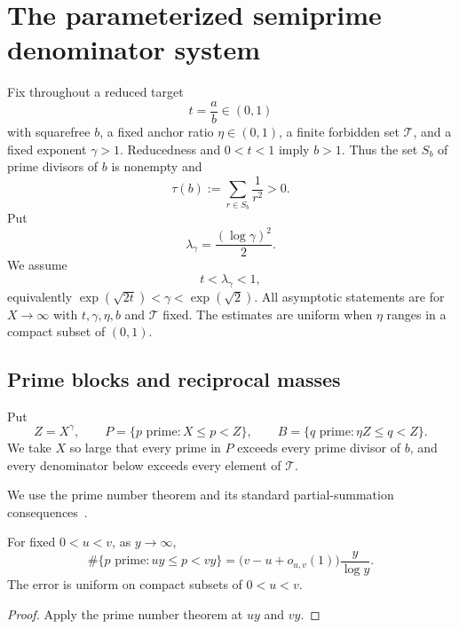 \section{The parameterized semiprime denominator system}
\label{sec:denominator-system}

Fix throughout a reduced target
\[
 t=\frac ab\in(0,1)
\]
with squarefree $b$, a fixed anchor ratio $\eta\in(0,1)$, a finite forbidden set $\mathcal T$, and a fixed exponent $\gamma>1$. Reducedness and $0<t<1$ imply $b>1$. Thus the set $S_b$ of prime divisors of $b$ is nonempty and
\begin{equation}
\label{eq:tau-positive}
 \tau(b):=\sum_{r\in S_b}\frac1{r^2}>0.
\end{equation}
Put
\begin{equation}
\label{eq:lambda-gamma}
 \lambda_\gamma=\frac{(\log\gamma)^2}{2}.
\end{equation}
We assume
\begin{equation}
\label{eq:admissible-region}
 t<\lambda_\gamma<1,
\end{equation}
equivalently $\exp(\sqrt{2t})<\gamma<\exp(\sqrt2)$. All asymptotic statements are for $X\to\infty$ with $t,\gamma,\eta,b$ and $\mathcal T$ fixed. The estimates are uniform when $\eta$ ranges in a compact subset of $(0,1)$.

\subsection{Prime blocks and reciprocal masses}

Put
\begin{equation}
\label{eq:prime-blocks}
 Z=X^\gamma,
 \qquad P=\{p\text{ prime}:X\leq p<Z\},
 \qquad B=\{q\text{ prime}:\eta Z\leq q<Z\}.
\end{equation}
We take $X$ so large that every prime in $P$ exceeds every prime divisor of $b$, and every denominator below exceeds every element of $\mathcal T$.

We use the prime number theorem and its standard partial-summation consequences~\cite[Chapter~1]{montgomery-vaughan-2007}.

\begin{lemma}
\label{lem:fixed-ratio-prime-supply}
For fixed $0<u<v$, as $y\to\infty$,
\[
 \#\{p\text{ prime}:uy\leq p<vy\}
 =\bigl(v-u+o_{u,v}(1)\bigr)\frac{y}{\log y}.
\]
The error is uniform on compact subsets of $0<u<v$.
\end{lemma}
\begin{proof}
Apply the prime number theorem at $uy$ and $vy$.
\end{proof}

